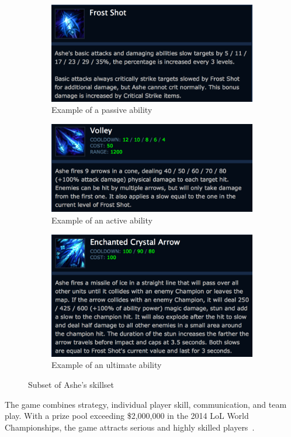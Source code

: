 \begin{figure}[!htb]
  \centering
  \begin{subfigure}[b]{0.49\textwidth}
    \includegraphics[width=\textwidth]{img/frostshot.png}
    \caption{Example of a passive ability}\label{fig:frostshot}
  \end{subfigure}
  \begin{subfigure}[b]{0.49\textwidth}
    \includegraphics[width=\textwidth]{img/volley.png}
    \caption{Example of an active ability}\label{fig:volley}
  \end{subfigure}
  \begin{subfigure}[b]{0.49\textwidth}
    \includegraphics[width=\textwidth]{img/enchanted.png}
    \caption{Example of an ultimate ability}\label{fig:enchanted}
  \end{subfigure}
  \caption{Subset of Ashe's skillset~\cite{ashe}}\label{fig:ashe}
\end{figure}

The game combines strategy, individual player skill, communication, and team play. With a prize pool exceeding \$2,000,000 in the 2014 LoL World Championships, the game attracts serious and highly skilled players~\cite{lolprize}.


